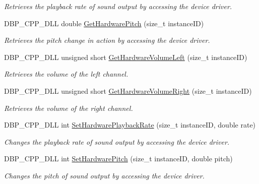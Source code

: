 \begin{DoxyCompactItemize}
\begin{DoxyCompactList}\small\item\em Retrieves the playback rate of sound output by accessing the device driver. \item\end{DoxyCompactList}\item 
DBP\_\-CPP\_\-DLL double \hyperlink{namespacemn_sound_a1e07da28da135a926c8dee4fb0b9192a}{GetHardwarePitch} (size\_\-t instanceID)
\begin{DoxyCompactList}\small\item\em Retrieves the pitch change in action by accessing the device driver. \item\end{DoxyCompactList}\item 
DBP\_\-CPP\_\-DLL unsigned short \hyperlink{namespacemn_sound_ad182e4402ae1e9ea2364a6e7700d8749}{GetHardwareVolumeLeft} (size\_\-t instanceID)
\begin{DoxyCompactList}\small\item\em Retrieves the volume of the left channel. \item\end{DoxyCompactList}\item 
DBP\_\-CPP\_\-DLL unsigned short \hyperlink{namespacemn_sound_aaf9d548648cf89ecd842e2cc7cf101a1}{GetHardwareVolumeRight} (size\_\-t instanceID)
\begin{DoxyCompactList}\small\item\em Retrieves the volume of the right channel. \item\end{DoxyCompactList}\item 
DBP\_\-CPP\_\-DLL int \hyperlink{namespacemn_sound_a446f7cc649730458178a1b14a776ffda}{SetHardwarePlaybackRate} (size\_\-t instanceID, double rate)
\begin{DoxyCompactList}\small\item\em Changes the playback rate of sound output by accessing the device driver. \item\end{DoxyCompactList}\item 
DBP\_\-CPP\_\-DLL int \hyperlink{namespacemn_sound_accb207d924c1fe844d439a58cc05bd0f}{SetHardwarePitch} (size\_\-t instanceID, double pitch)
\begin{DoxyCompactList}\small\item\em Changes the pitch of sound output by accessing the device driver. \item\end{DoxyCompactList}\item 

\end{DoxyCompactItemize}

